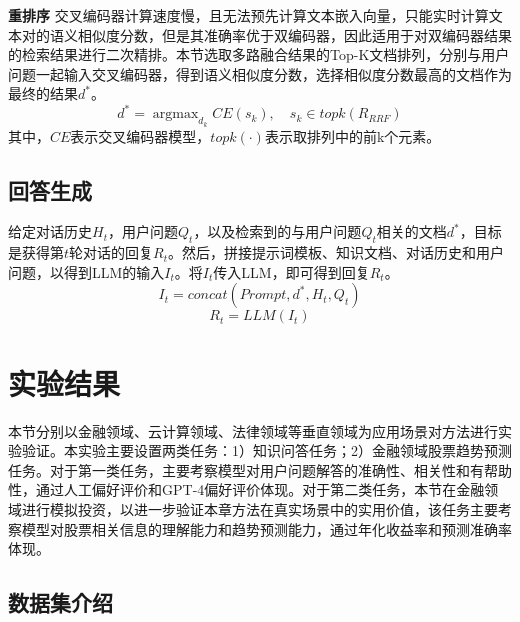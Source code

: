\textbf{重排序} 交叉编码器计算速度慢，且无法预先计算文本嵌入向量，只能实时计算文本对的语义相似度分数，但是其准确率优于双编码器，因此适用于对双编码器结果的检索结果进行二次精排。本节选取多路融合结果的Top-K文档排列，分别与用户问题一起输入交叉编码器，得到语义相似度分数，选择相似度分数最高的文档作为最终的结果$d^*$。
\begin{equation}
	d^* = \mathop{\arg\max}_{d_k}CE(s_k), \quad s_k \in topk(R_{RRF})
\end{equation}
其中，$CE$表示交叉编码器模型，$topk(\cdot)$表示取排列中的前k个元素。

\subsection{回答生成}

给定对话历史$H_t$，用户问题$Q_t$，以及检索到的与用户问题$Q_t$相关的文档$d^*$，目标是获得第$t$轮对话的回复$R_t$。然后，拼接提示词模板、知识文档、对话历史和用户问题，以得到LLM的输入$I_t$。将$I_t$传入LLM，即可得到回复$R_t$。
\begin{equation}
	I_t = concat(Prompt, d^*, H_t, Q_t)
\end{equation}
\begin{equation}
	R_t = LLM(I_t)
\end{equation}

\section{实验结果}

本节分别以金融领域、云计算领域、法律领域等垂直领域为应用场景对方法进行实验验证。本实验主要设置两类任务：1）知识问答任务；2）金融领域股票趋势预测任务。对于第一类任务，主要考察模型对用户问题解答的准确性、相关性和有帮助性，通过人工偏好评价和GPT-4偏好评价体现。对于第二类任务，本节在金融领域进行模拟投资，以进一步验证本章方法在真实场景中的实用价值，该任务主要考察模型对股票相关信息的理解能力和趋势预测能力，通过年化收益率和预测准确率体现。


\subsection{数据集介绍}

